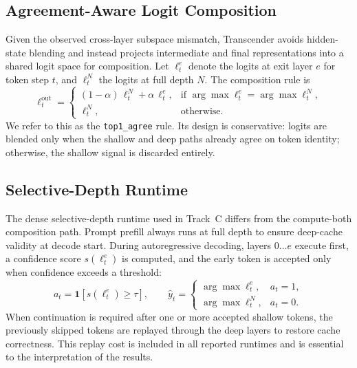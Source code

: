 \documentclass[11pt]{article}
\begin{document}
\subsection{Agreement-Aware Logit Composition}

Given the observed cross-layer subspace mismatch, Transcender avoids hidden-state blending and instead projects intermediate and final representations into a shared logit space for composition. Let $\ell_t^e$ denote the logits at exit layer $e$ for token step $t$, and $\ell_t^N$ the logits at full depth $N$. The composition rule is
\begin{equation}
\ell_t^{\mathrm{out}} =
\begin{cases}
(1-\alpha)\,\ell_t^N + \alpha\,\ell_t^e, &
\text{if } \arg\max \ell_t^e = \arg\max \ell_t^N, \\
\ell_t^N, & \text{otherwise.}
\end{cases}
\label{eq:blend}
\end{equation}
We refer to this as the \texttt{top1\_agree} rule. Its design is conservative: logits are blended only when the shallow and deep paths already agree on token identity; otherwise, the shallow signal is discarded entirely.

\subsection{Selective-Depth Runtime}

The dense selective-depth runtime used in Track~C differs from the compute-both composition path. Prompt prefill always runs at full depth to ensure deep-cache validity at decode start. During autoregressive decoding, layers $0 \ldots e$ execute first, a confidence score $s(\ell_t^e)$ is computed, and the early token is accepted only when confidence exceeds a threshold:
\begin{equation}
a_t = \mathbf{1}[s(\ell_t^e) \ge \tau], \qquad
\hat{y}_t =
\begin{cases}
\arg\max \ell_t^e, & a_t = 1, \\
\arg\max \ell_t^N, & a_t = 0.
\end{cases}
\label{eq:selective}
\end{equation}
When continuation is required after one or more accepted shallow tokens, the previously skipped tokens are replayed through the deep layers to restore cache correctness. This replay cost is included in all reported runtimes and is essential to the interpretation of the results.
\end{document}
